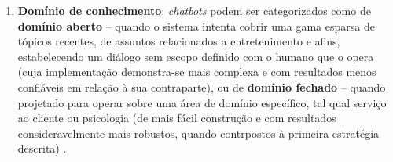 \begin{enumerate}
    \item \textbf{Domínio de conhecimento}: \textit{chatbots} podem ser categorizados como de \textbf{domínio aberto} -- quando o sistema intenta cobrir uma gama esparsa de tópicos recentes, de assuntos relacionados a entretenimento e afins, estabelecendo um diálogo sem escopo definido com o humano que o opera (cuja implementação demonstra-se mais complexa e com resultados menos confiáveis em relação à sua contraparte), ou de \textbf{domínio fechado} -- quando projetado para operar sobre uma área de domínio específico, tal qual serviço ao cliente ou psicologia (de mais fácil construção e com resultados consideravelmente mais robustos, quando contrpostos à primeira estratégia descrita) \cite{lokman2018modern}.
    

\end{enumerate}
